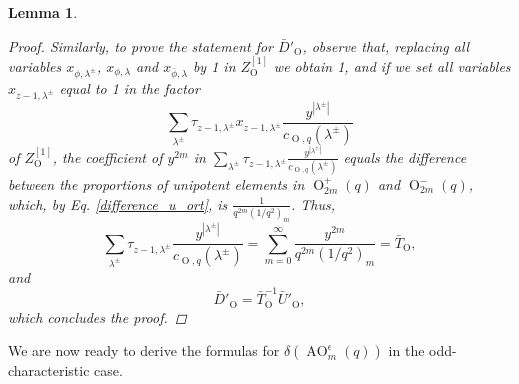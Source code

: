 \documentclass[a4paper, 12pt, oneside]{amsart}
\newtheorem{lemma}[prop]{Lemma}
\theoremstyle{definition}
\DeclareMathOperator{\AO}{AO}
\DeclareMathOperator{\Or}{O}
\begin{document}
\begin{lemma}
\begin{proof}
Similarly, to prove the statement for $\bar{D}'_{\Or}$, observe that, replacing all variables $x_{\phi,\lambda^{\pm}}$, $x_{\phi, \lambda}$ and $x_{\bar{\phi}, \lambda}$ by 1 in $Z^{[1]}_{\Or}$ we obtain 1, and if we set
all variables $x_{z-1,{\lambda^{\pm}}}$ equal to 1 in the factor
$$\sum_{\lambda^{\pm}}\tau_{z-1,\lambda^{\pm}}x_{z-1,\lambda^{\pm}}\frac{y^{|\lambda^{\pm}|}}{c_{\Or,q}(\lambda^{\pm})}$$
of $Z^{[1]}_{\Or}$, the coefficient of $y^{2m}$ in $\sum_{\lambda^{\pm}}\tau_{z-1,\lambda^{\pm}}\frac{y^{|\lambda^{\pm}|}}{c_{\Or,q}(\lambda^{\pm})}$ equals the difference between the proportions of unipotent elements in $\Or^+_{2m}(q)$ and  $\Or^-_{2m}(q)$, which, by Eq. \eqref{difference_u_ort}, is  $\frac{1}{q^{2m}(1/q^2)_m}$. Thus,
\begin{equation*}
\sum_{\lambda^{\pm}}\tau_{z-1,\lambda^{\pm}}\frac{y^{|\lambda^{\pm}|}}{c_{\Or,q}(\lambda^{\pm})}=\sum_{m=0}^{\infty}\frac{y^{2m}}{q^{2m}(1/q^2)_m}=\bar{T}_{\Or},
\end{equation*}
and 
\begin{equation*}
    \bar{D}'_{\Or}=\bar{T}^{-1}_{\Or}\bar{U}'_{\Or},
\end{equation*}
which concludes the proof.
\end{proof}
\end{lemma}
We are now ready to derive the formulas for $\delta(\AO^{\epsilon}_m(q))$ in the odd-characteristic case.
\end{document}
